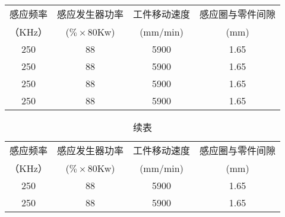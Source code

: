 \begin{table}[H]
    \centering
    \begin{tabular}{|c| c|c|c|}
    \hline
    感应频率 &感应发生器功率 & 工件移动速度  &感应圈与零件间隙\\
    （KHz）&($\% \times$80Kw) &(mm/min)  &(mm)\\
    \hline
    250 &88 &5900 &1.65\\
    \hline
    250 &88 &5900 &1.65\\
    \hline
    250 &88 &5900 &1.65\\
    \hline
    250 &88 &5900 &1.65\\
    \hline
    \end{tabular}
\end{table}


\begin{table}[H]
    \centering
    \captionsetup{singlelinecheck=off}
    \caption*{续表} %
    \begin{tabular}{|c| c|c|c|}
    \hline
    感应频率 &感应发生器功率 & 工件移动速度  &感应圈与零件间隙\\
    （KHz）&($\% \times$80Kw) &(mm/min)  &(mm)\\
    \hline
    250 &88 &5900 &1.65\\
    \hline
    250 &88 &5900 &1.65\\
    \hline
    \end{tabular}
\end{table}
